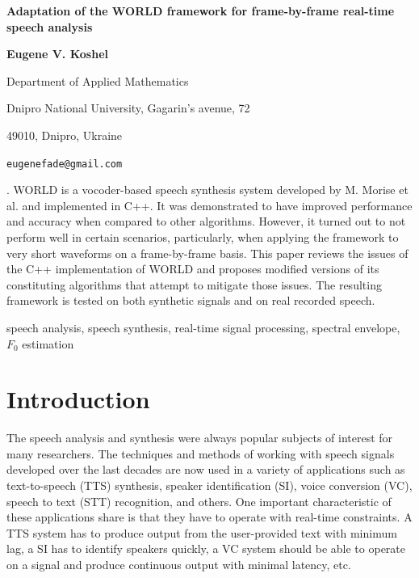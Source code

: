 \documentclass[a4paper]{article}
\begin{document}
\begin {center}{\bf\Large  Adaptation of the WORLD framework for frame-by-frame real-time speech analysis} \end {center}

\begin{center}
{\bf Eugene V. Koshel}

Department of Applied Mathematics

Dnipro National University, Gagarin's avenue, 72 

49010, Dnipro, Ukraine 

{\tt eugenefade@gmail.com}
\end{center}

. WORLD is a vocoder-based speech synthesis system developed by M. Morise et al. and implemented in C++. It was demonstrated to have improved performance and accuracy when compared to other algorithms. However, it turned out to not perform well in certain scenarios, particularly, when applying the framework to very short waveforms on a frame-by-frame basis. This paper reviews the issues of the C++ implementation of WORLD and proposes modified versions of its constituting algorithms that attempt to mitigate those issues. The resulting framework is tested on both synthetic signals and on real recorded speech.

\vspace{3mm}
 speech analysis, speech synthesis, real-time signal processing, spectral envelope, $F_0$ estimation

\section{Introduction}

The speech analysis and synthesis were always popular subjects of interest for many researchers. The techniques and methods of working with speech signals developed over the last decades are now used in a variety of applications such as text-to-speech (TTS) synthesis, speaker identification (SI), voice conversion (VC), speech to text (STT) recognition, and others. One important characteristic of these applications share is that they have to operate with real-time constraints. A TTS system has to produce output from the user-provided text with minimum lag, a SI has to identify speakers quickly, a VC system should be able to operate on a signal and produce continuous output with minimal latency, etc.
\end{document}
